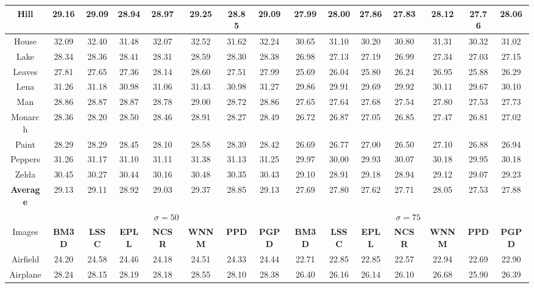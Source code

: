 \begin{table*}[t]
\begin{center}
\begin{tabular}{|c||c|c|c|c|c|c|c||c|c|c|c|c|c|c|}
\\
\hline
 Hill & 29.16 & 29.09 & 28.94 & 28.97 & 29.25 &28.85 & 29.09    & 27.99 & 28.00 & 27.86 & 27.83 & 28.12 &27.76 & 28.06 
\\
\hline
 House& 32.09 & 32.40  & 31.48  & 32.07 & 32.52& 31.62& 32.24    & 30.65  & 31.10 & 30.20 & 30.80  & 31.31&30.32 &31.02    
\\
\hline
 Lake   & 28.34 & 28.36  & 28.41   & 28.31   &  28.59&28.30 &28.38    & 26.98  & 27.13 &27.19  & 26.99 &27.34&27.03 & 27.15  
\\
\hline
 Leaves & 27.81 & 27.65& 27.36 & 28.14 & 28.60&27.51 &27.99     & 25.69 & 26.04 & 25.80 &26.24 & 26.95& 25.88 & 26.29  
\\
\hline
 Lena& 31.26 & 31.18  & 30.98 &  31.06& 31.43 &30.98 &31.27     & 29.86& 29.91 & 29.69& 29.92 & 30.11&29.67 &30.10   
\\
\hline
 Man& 28.86 & 28.87 & 28.87 & 28.78 & 29.00& 28.72 & 28.86    & 27.65  & 27.64 & 27.68& 27.54 &27.80 &27.53 & 27.73     
\\
\hline
 Monarch& 28.36 & 28.20 & 28.50 & 28.46 & 28.91& 28.27&28.49    &   26.72  & 26.87 &27.05  & 26.85 & 27.47&26.81 &27.02    
\\
\hline
 Paint & 28.29 & 28.29 & 28.45  &  28.10  & 28.58&28.39 &28.42    &  26.69 &  26.77 & 27.00  & 26.50 & 27.10& 26.88 & 26.94 
\\
\hline
 Peppers & 31.26 & 31.17 & 31.10 & 31.11  & 31.38 &31.13 & 31.25   &   29.97  & 30.00&  29.93 &  30.07 & 30.18&29.95  & 30.18    
\\
\hline
 Zelda & 30.45 & 30.27  & 30.44  &  30.16  & 30.48& 30.35 &30.43    & 29.10&28.91 &29.18  & 28.94 & 29.12&29.07 &29.23   
\\
\hline
 \textbf{Average} &  29.13 & 29.11  &  28.92 & 29.03  & 29.37 & 28.85 & 29.13   &27.69&27.80 & 27.62& 27.71&28.05 &27.53&27.88     
\\
\hline
\hline
&\multicolumn{7}{c||}{ $\sigma = 50$}&\multicolumn{7}{c|}{ $\sigma = 75$}
\\
\hline
\hline
Images&\textbf{BM3D}&\textbf{LSSC}&\textbf{EPLL}&\textbf{NCSR}&\textbf{WNNM}&\textbf{PPD}&\textbf{PGPD}
&\textbf{BM3D}&\textbf{LSSC}&\textbf{EPLL}&\textbf{NCSR}&\textbf{WNNM}&\textbf{PPD}&\textbf{PGPD} 
\\
\hline
 Airfield & 24.20 & 24.58 & 24.46  &24.18 & 24.51& 24.33 & 24.44    & 22.71 & 22.85 & 22.85 & 22.57 &22.94 &22.69 &22.90 
\\
\hline
 Airplane & 28.24 & 28.15 & 28.19 & 28.18 &  28.55&28.10& 28.38     & 26.40 & 26.16 & 26.14  & 26.10 &  26.68&25.90& 26.39

\end{tabular}
\end{center}
\end{table*}
